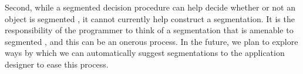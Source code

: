 %

Second, while a segmented \invariantconfluence{} decision procedure can help
decide whether or not an object is segmented \invariantconfluent{}, it cannot
currently help construct a segmentation. It is the responsibility of the
programmer to think of a segmentation that is amenable to segmented
\invariantconfluence{}, and this can be an onerous process. In the future, we
plan to explore ways by which we can automatically suggest segmentations to the
application designer to ease this process.
